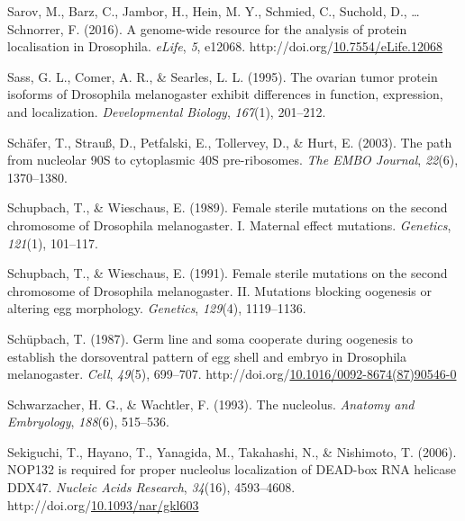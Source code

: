 \documentclass[12pt,oneside]{reedthesis}
\newlength{\cslhangindent}
\newenvironment{CSLReferences}[2] %
 {%
  \setlength{\parindent}{0pt}
  \ifodd #1 \everypar{\setlength{\hangindent}{\cslhangindent}}\ignorespaces\fi
  \ifnum #2 > 0
  \setlength{\parskip}{#2\baselineskip}
  \fi
 }%
 {}
\begin{document}
\begin{CSLReferences}{1}{0}
\leavevmode{}%
Sarov, M., Barz, C., Jambor, H., Hein, M. Y., Schmied, C., Suchold, D., \ldots{} Schnorrer, F. (2016). A genome-wide resource for the analysis of protein localisation in {Drosophila}. \emph{eLife}, \emph{5}, e12068. http://doi.org/\href{https://doi.org/10.7554/eLife.12068}{10.7554/eLife.12068}

\leavevmode{}%
Sass, G. L., Comer, A. R., \& Searles, L. L. (1995). The ovarian tumor protein isoforms of {Drosophila} melanogaster exhibit differences in function, expression, and localization. \emph{Developmental Biology}, \emph{167}(1), 201--212.

\leavevmode{}%
Schäfer, T., Strauß, D., Petfalski, E., Tollervey, D., \& Hurt, E. (2003). The path from nucleolar {90S} to cytoplasmic {40S} pre-ribosomes. \emph{The EMBO Journal}, \emph{22}(6), 1370--1380.

\leavevmode{}%
Schupbach, T., \& Wieschaus, E. (1989). Female sterile mutations on the second chromosome of {Drosophila} melanogaster. {I}. {Maternal} effect mutations. \emph{Genetics}, \emph{121}(1), 101--117.

\leavevmode{}%
Schupbach, T., \& Wieschaus, E. (1991). Female sterile mutations on the second chromosome of {Drosophila} melanogaster. {II}. {Mutations} blocking oogenesis or altering egg morphology. \emph{Genetics}, \emph{129}(4), 1119--1136.

\leavevmode{}%
Schüpbach, T. (1987). Germ line and soma cooperate during oogenesis to establish the dorsoventral pattern of egg shell and embryo in {Drosophila} melanogaster. \emph{Cell}, \emph{49}(5), 699--707. http://doi.org/\href{https://doi.org/10.1016/0092-8674(87)90546-0}{10.1016/0092-8674(87)90546-0}

\leavevmode{}%
Schwarzacher, H. G., \& Wachtler, F. (1993). The nucleolus. \emph{Anatomy and Embryology}, \emph{188}(6), 515--536.

\leavevmode{}%
Sekiguchi, T., Hayano, T., Yanagida, M., Takahashi, N., \& Nishimoto, T. (2006). {NOP132} is required for proper nucleolus localization of {DEAD-box RNA} helicase {DDX47}. \emph{Nucleic Acids Research}, \emph{34}(16), 4593--4608. http://doi.org/\href{https://doi.org/10.1093/nar/gkl603}{10.1093/nar/gkl603}


\end{CSLReferences}
\end{document}
